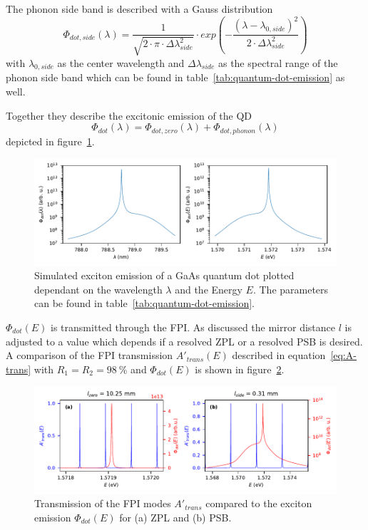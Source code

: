 The phonon side band is described with a Gauss distribution
\begin{equation}
\Phi_{dot,side}(\lambda) = \frac{1}{\sqrt{2\cdot\pi\cdot \Delta\lambda_{side}^2}}\cdot exp\left(-\frac{(\lambda - \lambda_{0, side})^2}{2\cdot \Delta\lambda_{side}^2}\right)
\end{equation}
with $\lambda_{0, side}$ as the center wavelength and $\Delta\lambda_{side}$ as the spectral range of the phonon side band which can be found in table~\ref{tab:quantum-dot-emission} as well.

Together they describe the excitonic emission of the \ac{QD}
\begin{equation}
\Phi_{dot}(\lambda) = \Phi_{dot,zero}(\lambda) + \Phi_{dot,phonon}(\lambda)
\end{equation}
depicted in figure~\ref{fig:quantumdotemissionwavelengthenergy}.

\begin{figure}[H]
	\centering
	\includegraphics{figures/fabry-perot/plots/quantum_dot_emission_wavelength_energy}
	\caption[Simulated exciton emission of a GaAs quantum dot]{Simulated exciton emission of a GaAs quantum dot plotted dependant on the wavelength $\lambda$ and the Energy $E$.
		The parameters can be found in table~\ref{tab:quantum-dot-emission}.}
	\label{fig:quantumdotemissionwavelengthenergy}
\end{figure}

$\Phi_{dot}(E)$ is transmitted through the \ac{FPI}.
As discussed the mirror distance $l$ is adjusted to a value which depends if a resolved \ac{ZPL} or a resolved \ac{PSB} is desired.
A comparison of the \ac{FPI} transmission $A'_{trans}(E)$ described in equation~\ref{eq:A-trans} with $R_1=R_2=\SI{98}{\percent}$ and $\Phi_{dot}(E)$ is shown in figure~\ref{fig:simulation-comparison-dot-fabry-perot-modes}.
\begin{figure}[H]
	\centering
	\includegraphics[width=\linewidth]{figures/fabry-perot/plots/simulation-comparison-dot-fabry-perot-modes}
	\caption{Transmission of the FPI modes $A'_{trans}$ compared to the exciton emission $\Phi_{dot}(E)$ for (a) ZPL and (b) PSB.}
	\label{fig:simulation-comparison-dot-fabry-perot-modes}
\end{figure}

